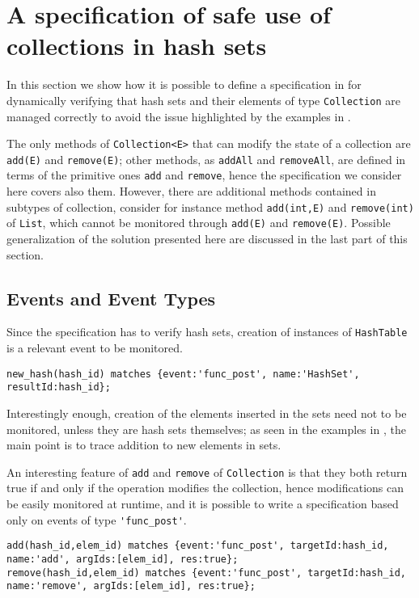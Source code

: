 \section{A specification of safe use of collections in hash sets}
\label{sec:spec}
In this section we show how it is possible to define a specification in \rml for dynamically verifying that hash sets and their elements of
type \lstinline{Collection} are managed correctly to avoid the issue highlighted by the examples in .

The only methods of \lstinline{Collection<E>} that can modify the state of a collection are \lstinline{add(E)} and \lstinline{remove(E)}; other methods, as \lstinline{addAll} and \lstinline{removeAll}, are defined in terms of the primitive ones \lstinline{add} and \lstinline{remove}, hence the specification we consider here covers also them. However, there are additional methods contained in subtypes of collection, consider for instance method
\lstinline{add(int,E)} and \lstinline{remove(int)} of \lstinline{List}, which cannot be monitored through \lstinline{add(E)} and \lstinline{remove(E)}. Possible generalization of the solution presented here are discussed in the last part of this section.

\subsection{Events and Event Types} Since the specification has to verify hash sets, creation of instances of \lstinline{HashTable} is a relevant event
to be monitored.
\begin{lstlisting}[basicstyle=\ttfamily\scriptsize]
new_hash(hash_id) matches {event:'func_post', name:'HashSet', resultId:hash_id};
\end{lstlisting}
Interestingly enough, creation of the elements inserted in the sets need not to be monitored, unless they are hash sets themselves;
as seen in the examples in , the main point is to trace addition to new elements in sets.

An interesting feature of \lstinline{add} and \lstinline{remove} of \lstinline{Collection} is that they both return true if and only if the operation modifies the collection, hence modifications can be easily monitored at runtime, and it is possible to write a specification based only on events of type \lstinline{'func_post'}.

\begin{lstlisting}[basicstyle=\ttfamily\scriptsize]
add(hash_id,elem_id) matches {event:'func_post', targetId:hash_id, name:'add', argIds:[elem_id], res:true};
remove(hash_id,elem_id) matches {event:'func_post', targetId:hash_id, name:'remove', argIds:[elem_id], res:true};
\end{lstlisting}

